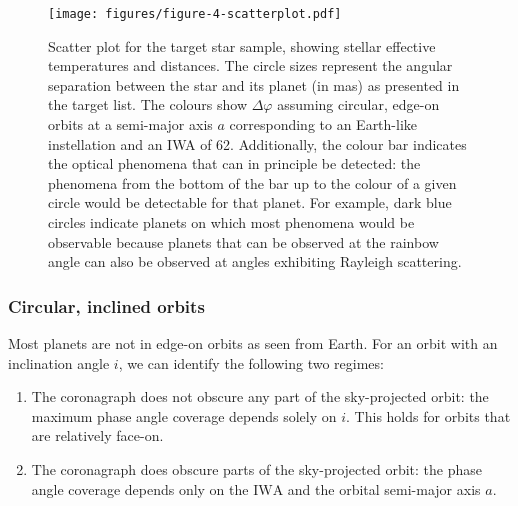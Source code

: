\documentclass[usenatbib]{mnras}
\newcommand{\IWA}{\ensuremath{\mathrm{IWA}}\xspace}
\begin{document}
\begin{figure*}
    \centering
    \texttt{[image: figures/figure-4-scatterplot.pdf]}
    \caption{
        Scatter plot for the target star sample, showing stellar effective temperatures and distances.
        The circle sizes represent the angular separation between the star and its planet (in mas) as presented in the target list.
        The colours show $\Delta \varphi$ assuming circular, edge-on orbits at a semi-major axis $a$ corresponding to an Earth-like instellation and an IWA of \qty{62}{\mas}.
        Additionally, the colour bar indicates the optical phenomena that can in principle be detected: the phenomena from the bottom of the bar up to the colour of a given circle would be detectable for that planet.
        For example, dark blue circles indicate planets on which most phenomena would be observable because planets that can be observed at the rainbow angle can also be observed at angles exhibiting Rayleigh scattering.
    }
    \label{fig:scatterplot}
\end{figure*}





\subsubsection{Circular, inclined orbits}

Most planets are not in edge-on orbits as seen from Earth.
For an orbit with an inclination angle $i$, we can identify the following two regimes:%
\begin{enumerate}
    \item The coronagraph does not obscure any part of the sky-projected orbit: 
    the maximum phase angle coverage depends solely on $i$. 
        This holds for orbits that are relatively face-on. 
    \item The coronagraph does obscure parts of the sky-projected orbit: the phase angle coverage depends only on the \IWA and the orbital semi-major axis $a$. 
\end{enumerate}

\end{document}
